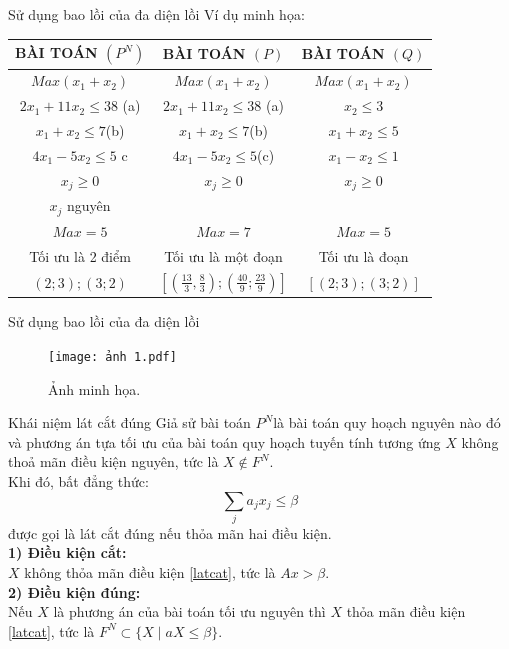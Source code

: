 \documentclass[10pt]{beamer}
\begin{document}
\begin{frame}{Sử dụng bao lồi của đa diện lồi}
    Ví dụ minh họa:\\
    \begin{tabular}{|c|c|c|}
    \hline
     BÀI TOÁN $(P^N)$  & BÀI TOÁN $(P)$& BÀI TOÁN $(Q)$  \\
     \hline
       $Max (x_1+x_2)$  & $Max (x_1+x_2) $ &$Max (x_1+x_2)$ \\
$2x_1+11x_2\le 38$ \quad (a) & $2x_1+11x_2 \le 38$  \quad (a) & $x_2\le 3$\\
$x_1+x_2\le 7$\quad (b) &$x_1+x_2\le 7$\quad (b) & $x_1+x_2\le 5$\\
$4x_1-5x_2\le 5$ \quad c & $4x_1-5x_2\le 5$\quad (c) & $x_1-x_2\le 1$\\
$x_j\ge 0$ & $x_j\ge 0$ & $x_j\ge 0$\\
$x_j$ nguyên & &\\
\hline 
$Max= 5$& $Max=7$ &$Max=5$\\
Tối ưu là 2 điểm & Tối ưu là một đoạn & Tối ưu là đoạn\\
$(2;3);(3;2)$&$[(\frac{13}{3},\frac{8}{3}); (\frac{40}{9};\frac{23}{9})]$&$[(2;3);(3;2)]$\\
\hline
    \end{tabular}
\end{frame}

\begin{frame}{Sử dụng bao lồi của đa diện lồi}
    \begin{figure}[h]
        \centering
        \texttt{[image: ảnh 1.pdf]}
        \caption{Ảnh minh họa.}
        \label{fig:enter-label}
    \end{figure}
\end{frame}

\begin{frame}{Khái niệm lát cắt đúng}
     Giả sử bài toán $P^N$là bài toán quy hoạch nguyên nào đó và phương án tựa tối ưu của bài toán quy hoạch tuyến tính tương ứng $X$ không thoả mãn điều kiện 
nguyên, tức là $X \notin  F^N$.\\
Khi đó, bất đẳng thức:
    $$\sum _j a_jx_j \le \beta$$\label{latcat}
    được gọi là lát cắt đúng nếu thỏa mãn hai điều kiện.\\
    
       \textbf{ 1) Điều kiện cắt:} \\
        $X$ không thỏa mãn điều kiện \eqref{latcat}, tức là $Ax > \beta$.\\
    \textbf{2) Điều kiện đúng:}\\
       Nếu $X$ là phương án của bài toán tối ưu nguyên thì $X$ thỏa mãn điều kiện \eqref{latcat}, tức là 
 $F^N \subset \{X\mid aX\le \beta\}$.\\
    \end{frame}
\end{document}
